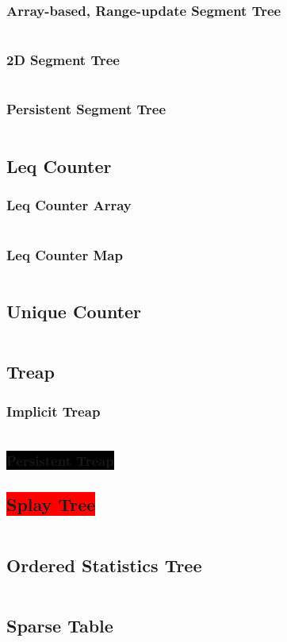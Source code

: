 \documentclass[8pt,a4paper,landscape,oneside]{amsart}
\newcommand{\code}[1]{\inputminted[fontsize=\normalsize,baselinestretch=1]{cpp}{_code/#1}}
\newcommand{\subsectionRed}[1]{\subsection{\colorbox{red}{\color{white}#1}}}
\newcommand{\subsubsectionBlack}[1]{\subsubsection{\colorbox{black}{\color{white}#1}}}
\begin{document}
\begin{multicols*}{3}
    \subsubsection{Array-based, Range-update Segment Tree}
      \code{data-structures/segtree_array_lazy.cpp}
    \subsubsection{2D Segment Tree}
      \code{data-structures/segtree_2d.cpp}
    \subsubsection{Persistent Segment Tree}
      \code{data-structures/segtree_persistent_rec.cpp}
  \subsection{Leq Counter}
    \subsubsection{Leq Counter Array}
      \code{data-structures/leq_counter_ar.cpp}
    \subsubsection{Leq Counter Map}
      \code{data-structures/leq_counter_map.cpp}
  \subsection{Unique Counter}
    \code{data-structures/unique_counter.cpp}
  \subsection{Treap}
		\subsubsection{Implicit Treap}
			\code{data-structures/treap_implicit.cpp}
		\subsubsectionBlack{Persistent Treap}
  \subsectionRed{Splay Tree}
    \code{data-structures/splay.cpp}
	\subsection{Ordered Statistics Tree}
    \code{data-structures/ordered_statistics_tree.cpp}
  \subsection{Sparse Table}

\end{multicols*}
\end{document}
